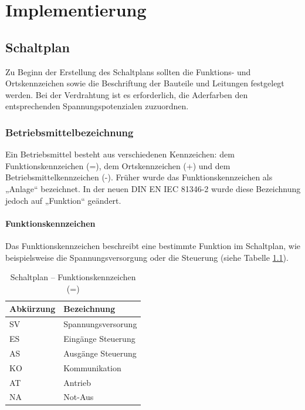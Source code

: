 \chapter{Implementierung}
\label{chapter:Implementierung}

\section{Schaltplan}
\label{section:Schaltplan}
Zu Beginn der Erstellung des Schaltplans sollten die Funktions- und Ortskennzeichen sowie die Beschriftung der Bauteile und Leitungen festgelegt werden. Bei der Verdrahtung ist es erforderlich, die Aderfarben den entsprechenden Spannungspotenzialen zuzuordnen.

\subsection{Betriebsmittelbezeichnung}
\label{Schaltplan:BMK}

Ein Betriebsmittel besteht aus verschiedenen Kennzeichen: dem Funktionskennzeichen (=), dem Ortskennzeichen (+) und dem Betriebsmittelkennzeichen (-). Früher wurde das Funktionskennzeichen als „Anlage“ bezeichnet. In der neuen DIN EN IEC 81346-2 \cite{DIN_EN_IEC_81346-2} wurde diese Bezeichnung jedoch auf „Funktion“ geändert.

\subsubsection{Funktionskennzeichen}
Das Funktionskennzeichen beschreibt eine bestimmte Funktion im Schaltplan, wie beispielsweise die Spannungsversorgung oder die Steuerung (siehe Tabelle \ref{BMK:tab:funktionskennzeichen}).

\pagebreak[1]
\begin{table}[!ht]
	\centering
	\caption{Schaltplan – Funktionskennzeichen (=)}
	\label{BMK:tab:funktionskennzeichen}
	\begin{tabular}{ll}
		\hline
		\textbf{Abkürzung}      & \textbf{Bezeichnung} \\ \hline
		\multicolumn{1}{l|}{SV} & Spannungsversorung   \\
		\multicolumn{1}{l|}{ES} & Eingänge Steuerung   \\
		\multicolumn{1}{l|}{AS} & Ausgänge Steuerung   \\
		\multicolumn{1}{l|}{KO} & Kommunikation        \\
		\multicolumn{1}{l|}{AT} & Antrieb              \\
		\multicolumn{1}{l|}{NA} & Not-Aus              \\ \hline
	\end{tabular}
\end{table}
\pagebreak[1]

